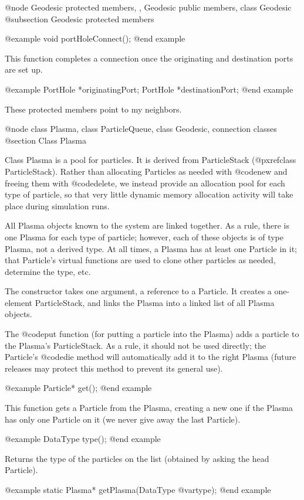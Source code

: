 @node Geodesic protected members,  , Geodesic public members, class Geodesic
@subsection Geodesic protected members

@example
void portHoleConnect();
@end example

This function completes a connection once the originating and
destination ports are set up.

@example
PortHole *originatingPort;
PortHole *destinationPort;
@end example

These protected members point to my neighbors.

@node class Plasma, class ParticleQueue, class Geodesic, connection classes
@section Class Plasma

Class Plasma is a pool for particles.  It is derived from ParticleStack
(@pxref{class ParticleStack}).
Rather than allocating Particles as needed with @code{new} and freeing
them with @code{delete}, we instead provide an allocation pool for each
type of particle, so that very little dynamic memory allocation activity
will take place during simulation runs.

All Plasma objects known to the system are linked together.  As a rule,
there is one Plasma for each type of particle; however, each of these
objects is of type Plasma, not a derived type.  At all times, a Plasma
has at least one Particle in it; that Particle's virtual functions are
used to clone other particles as needed, determine the type, etc.

The constructor takes one argument, a reference to a Particle.  It
creates a one-element ParticleStack, and links the Plasma into a linked
list of all Plasma objects.

The @code{put} function (for putting a particle into the Plasma) adds a
particle to the Plasma's ParticleStack.  As a rule, it should not be
used directly; the Particle's @code{die} method will automatically add
it to the right Plasma (future releases may protect this method to
prevent its general use).

@example
Particle* get();
@end example

This function gets a Particle from the Plasma, creating a new one if
the Plasma has only one Particle on it (we never give away the last
Particle).

@example
DataType type();
@end example

Returns the type of the particles on the list (obtained by asking the
head Particle).

@example
static Plasma* getPlasma(DataType @var{type});
@end example

